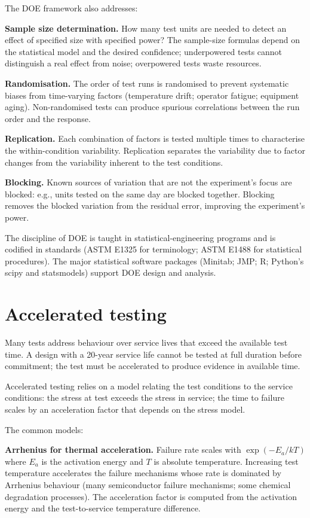 The DOE framework also addresses:

\textbf{Sample size determination.} How many test units are needed to detect an effect of specified size with specified power? The sample-size formulas depend on the statistical model and the desired confidence; underpowered tests cannot distinguish a real effect from noise; overpowered tests waste resources.

\textbf{Randomisation.} The order of test runs is randomised to prevent systematic biases from time-varying factors (temperature drift; operator fatigue; equipment aging). Non-randomised tests can produce spurious correlations between the run order and the response.

\textbf{Replication.} Each combination of factors is tested multiple times to characterise the within-condition variability. Replication separates the variability due to factor changes from the variability inherent to the test conditions.

\textbf{Blocking.} Known sources of variation that are not the experiment's focus are blocked: e.g., units tested on the same day are blocked together. Blocking removes the blocked variation from the residual error, improving the experiment's power.

The discipline of DOE is taught in statistical-engineering programs and is codified in standards (ASTM E1325 for terminology; ASTM E1488 for statistical procedures). The major statistical software packages (Minitab; JMP; R; Python's scipy and statsmodels) support DOE design and analysis.

\section{Accelerated testing}

Many tests address behaviour over service lives that exceed the available test time. A design with a 20-year service life cannot be tested at full duration before commitment; the test must be accelerated to produce evidence in available time.

Accelerated testing relies on a model relating the test conditions to the service conditions: the stress at test exceeds the stress in service; the time to failure scales by an acceleration factor that depends on the stress model.

The common models:

\textbf{Arrhenius for thermal acceleration.} Failure rate scales with $\exp(-E_a / kT)$ where $E_a$ is the activation energy and $T$ is absolute temperature. Increasing test temperature accelerates the failure mechanisms whose rate is dominated by Arrhenius behaviour (many semiconductor failure mechanisms; some chemical degradation processes). The acceleration factor is computed from the activation energy and the test-to-service temperature difference.

